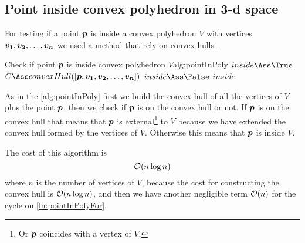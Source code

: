 \documentclass[dissertation.tex]{subfiles}
\begin{document}
\subsection{Point inside convex polyhedron in 3-d space}
For testing if a point $\boldsymbol{p}$ is inside a convex polyhedron $V$ with
vertices $\boldsymbol{v_1},\boldsymbol{v_2},\dots,\boldsymbol{v_n}$ we used a method that rely
on convex hulls \cite{deberg}\cite{schneider}.

\begin{algo}{Check if point $\boldsymbol{p}$ is inside convex polyhedron $V$}{alg:pointInPoly}
  \State $inside\Ass\True$
  \State $C\Ass convexHull([\ve{p},\ve{v_1},\ve{v_2},\dots,\ve{v_n}])$
  \label{ln:pointInPolyFor}
  \State $inside\Ass\False$
  \State \Break
  \EndIf
  \EndFor
  \State\Return $inside$
  \EndFunction
\end{algo}
As in the \cref{alg:pointInPoly} first we build the convex hull of all
the vertices of $V$ plus the point $\boldsymbol{p}$, then we check if $\boldsymbol{p}$
is on the convex hull or not. If $\boldsymbol{p}$ is on the convex hull that
means that $\boldsymbol{p}$ is external\footnote{Or $\boldsymbol{p}$ coincides with a
  vertex of $V$.} to $V$ because we have extended the convex hull
formed by the vertices of $V$. Otherwise this means that $\boldsymbol{p}$ is
inside $V$.

The cost of this algorithm is
\begin{equation*}
  \mathcal{O}(n\log n)
\end{equation*}
where $n$ is the number of vertices of $V$, because the cost for
constructing the convex hull is \cite{deberg} $\mathcal{O}(n\log n)$, and
then we have another negligible term $\mathcal{O}(n)$ for the cycle on \cref{ln:pointInPolyFor}.
\end{document}

